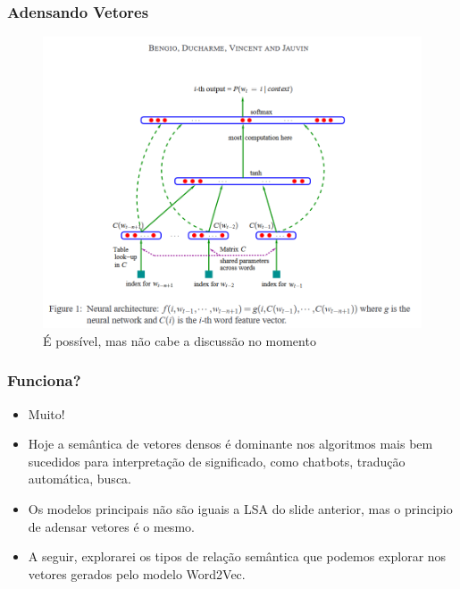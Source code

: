 \documentclass{beamer}
\begin{document}



\begin{frame}
\frametitle{Adensando Vetores}
\begin{figure}
	\centering
	\includegraphics[width=0.7\linewidth]{bengio03}
	\caption{É possível, mas não cabe a discussão no momento}
	\label{fig:bengio03}
\end{figure}

\end{frame}


\begin{frame}
\frametitle{Funciona?}
\begin{itemize}
\item Muito!\\
\item Hoje a semântica de vetores densos é dominante nos algoritmos mais bem sucedidos para interpretação de significado, como chatbots, tradução automática, busca.\\
\item Os modelos principais não são iguais a LSA do slide anterior, mas o principio de adensar vetores é o mesmo.\\
\item A seguir, explorarei os tipos de relação semântica que podemos explorar nos vetores gerados pelo modelo Word2Vec.\\
\end{itemize}
\end{frame}

\end{document}
